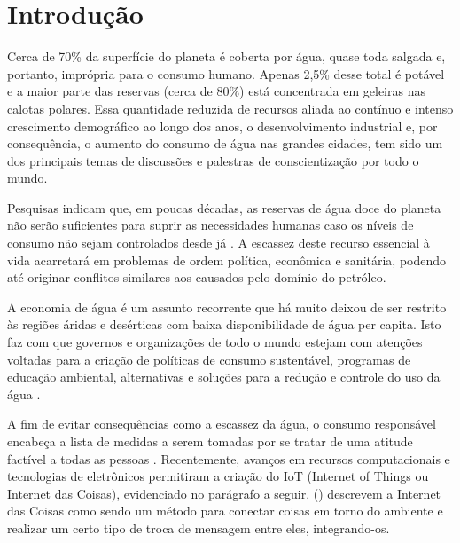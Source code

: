\chapter[Introdução]{Introdução}

Cerca de 70\% da superfície do planeta é coberta por água, quase toda salgada e, portanto, imprópria para o consumo humano. Apenas 2,5\% desse total é potável e a maior parte das reservas (cerca de 80\%) está concentrada em geleiras nas calotas polares. 
Essa quantidade reduzida de recursos aliada ao contínuo e intenso crescimento demográfico ao longo dos anos, o desenvolvimento industrial e, por consequência, o aumento do consumo de água nas grandes cidades, tem sido um dos principais temas de discussões e palestras de conscientização por todo o mundo. \cite{aguaconsumo}

Pesquisas indicam que, em poucas décadas, as reservas de água doce do planeta não serão suficientes para suprir as necessidades humanas caso os níveis de consumo não sejam controlados desde já \cite{Diarias2007}. A escassez deste recurso essencial à vida acarretará em problemas de ordem política, econômica e sanitária, podendo até originar conflitos similares aos causados pelo domínio do petróleo.

A economia de água é um assunto recorrente que há muito deixou de ser restrito às regiões áridas e desérticas com baixa disponibilidade de água per capita. Isto faz com que governos e organizações de todo o mundo estejam com atenções voltadas para a criação de políticas de consumo sustentável, programas de educação ambiental, alternativas e soluções para a redução e controle do uso da água \cite{ferreirasistema}.

A fim de evitar consequências como a escassez da água, o consumo
responsável encabeça a lista de medidas a serem tomadas por se tratar de uma atitude factível a todas as pessoas \cite{Diarias2007}. Recentemente, avanços em recursos computacionais e tecnologias de eletrônicos permitiram a criação  do IoT (Internet of Things ou Internet das Coisas), evidenciado no parágrafo a seguir. \citeauthor{Perumal2016} (\citeyear{Perumal2016}) descrevem a Internet das Coisas como sendo um método para conectar coisas em torno do ambiente e realizar um certo tipo de troca de mensagem entre eles, integrando-os.

